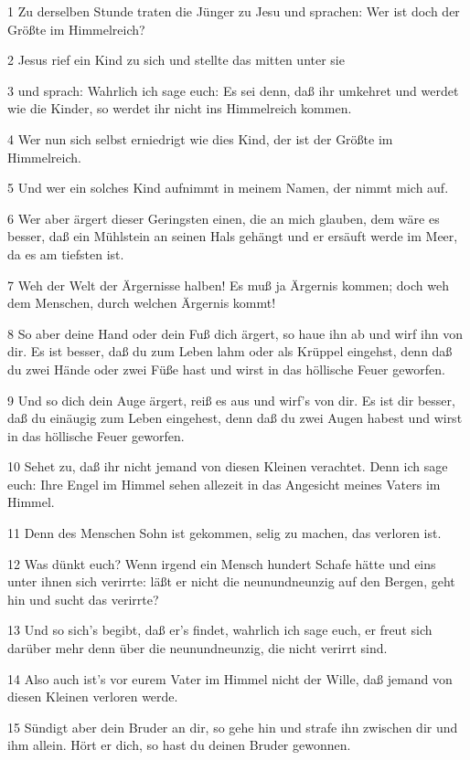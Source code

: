 \par 1 Zu derselben Stunde traten die Jünger zu Jesu und sprachen: Wer ist doch der Größte im Himmelreich?
\par 2 Jesus rief ein Kind zu sich und stellte das mitten unter sie
\par 3 und sprach: Wahrlich ich sage euch: Es sei denn, daß ihr umkehret und werdet wie die Kinder, so werdet ihr nicht ins Himmelreich kommen.
\par 4 Wer nun sich selbst erniedrigt wie dies Kind, der ist der Größte im Himmelreich.
\par 5 Und wer ein solches Kind aufnimmt in meinem Namen, der nimmt mich auf.
\par 6 Wer aber ärgert dieser Geringsten einen, die an mich glauben, dem wäre es besser, daß ein Mühlstein an seinen Hals gehängt und er ersäuft werde im Meer, da es am tiefsten ist.
\par 7 Weh der Welt der Ärgernisse halben! Es muß ja Ärgernis kommen; doch weh dem Menschen, durch welchen Ärgernis kommt!
\par 8 So aber deine Hand oder dein Fuß dich ärgert, so haue ihn ab und wirf ihn von dir. Es ist besser, daß du zum Leben lahm oder als Krüppel eingehst, denn daß du zwei Hände oder zwei Füße hast und wirst in das höllische Feuer geworfen.
\par 9 Und so dich dein Auge ärgert, reiß es aus und wirf's von dir. Es ist dir besser, daß du einäugig zum Leben eingehest, denn daß du zwei Augen habest und wirst in das höllische Feuer geworfen.
\par 10 Sehet zu, daß ihr nicht jemand von diesen Kleinen verachtet. Denn ich sage euch: Ihre Engel im Himmel sehen allezeit in das Angesicht meines Vaters im Himmel.
\par 11 Denn des Menschen Sohn ist gekommen, selig zu machen, das verloren ist.
\par 12 Was dünkt euch? Wenn irgend ein Mensch hundert Schafe hätte und eins unter ihnen sich verirrte: läßt er nicht die neunundneunzig auf den Bergen, geht hin und sucht das verirrte?
\par 13 Und so sich's begibt, daß er's findet, wahrlich ich sage euch, er freut sich darüber mehr denn über die neunundneunzig, die nicht verirrt sind.
\par 14 Also auch ist's vor eurem Vater im Himmel nicht der Wille, daß jemand von diesen Kleinen verloren werde.
\par 15 Sündigt aber dein Bruder an dir, so gehe hin und strafe ihn zwischen dir und ihm allein. Hört er dich, so hast du deinen Bruder gewonnen.
